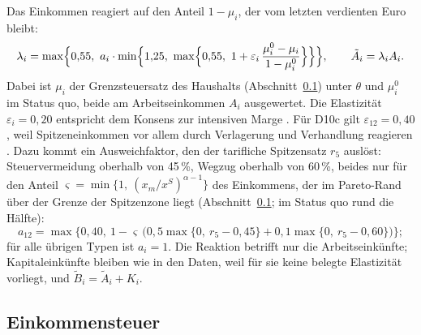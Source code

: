 Das Einkommen reagiert auf den Anteil $1-\mu_i$, der vom letzten verdienten
Euro bleibt:
\begin{equation}
  \lambda_i = \max\Bigl\{0{,}55,\ a_i\cdot\min\Bigl\{1{,}25,\ \max\Bigl\{0{,}55,\ 1 + \varepsilon_i\,\frac{\mu_i^0 - \mu_i}{1 - \mu_i^0}\Bigr\}\Bigr\}\Bigr\},
  \qquad \tilde A_i = \lambda_i A_i .
\end{equation}
Dabei ist $\mu_i$ der Grenzsteuersatz des Haushalts (Abschnitt~\ref{sec:est})
unter $\theta$ und $\mu_i^0$ im Status quo, beide am Arbeitseinkommen $A_i$
ausgewertet. Die Elastizität $\varepsilon_i = 0{,}20$ entspricht dem Konsens
zur intensiven Marge \parencite{gruber2002,saez2012}. Für D10c gilt
$\varepsilon_{12} = 0{,}40$, weil Spitzeneinkommen vor allem durch Verlagerung
und Verhandlung reagieren \parencite{piketty2014,kleven2014}. Dazu kommt ein
Ausweichfaktor, den der tarifliche Spitzensatz $r_5$ auslöst: Steuervermeidung
oberhalb von 45\,\%, Wegzug oberhalb von 60\,\%, beides nur für den Anteil
$\varsigma = \min\{1,\ (x_m/x^S)^{\alpha-1}\}$ des Einkommens, der im Pareto-Rand
über der Grenze der Spitzenzone liegt (Abschnitt~\ref{sec:est}; im Status quo rund
die Hälfte):
\begin{equation}
  a_{12} = \max\bigl\{0{,}40,\ 1 - \varsigma\,\bigl(0{,}5\max\{0,\ r_5-0{,}45\} + 0{,}1\max\{0,\ r_5-0{,}60\}\bigr)\bigr\};
\end{equation}
für alle übrigen Typen ist $a_i = 1$. Die Reaktion betrifft nur die
Arbeitseinkünfte; Kapitaleinkünfte bleiben wie in den Daten, weil für sie keine
belegte Elastizität vorliegt, und $\tilde B_i = \tilde A_i + K_i$.

\subsection{Einkommensteuer}
\label{sec:est}

